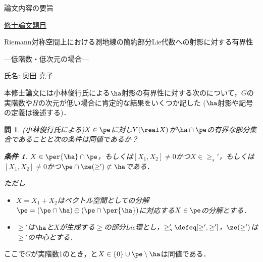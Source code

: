 \documentclass[12pt,dvipdfmx,uplatex]{jsarticle}
\newcounter{countabst}
\newtheorem{prob-a}[countabst]{問}
\newtheorem{cond-a}[countabst]{条件}
\newcommand{\nsubset}{\not\subset}
\begin{document}
% 
\begin{center}
  論文内容の要旨
\end{center}

\noindent\underline{修士論文題目}
\vspace{-1em}
\begin{center}
  Riemann対称空間上における測地線の簡約部分Lie代数への射影に対する有界性

  ---低階数・低次元の場合---
\end{center}
\vspace{-0.5em}

\noindent 氏名: 奥田 堯子

\vspace{0.5em}

本修士論文には小林俊行氏による$\ha$射影の有界性に対する次のについて，$G$の実階数や$H$の次元が低い場合に肯定的な結果をいくつか記した ($\ha$射影や記号の定義は後述する)．

\begin{prob-a}(小林俊行氏による)\label{prob:1121}
  $X\in \pe$に対し$Y(\real X)$が$ \ha\cap \pe$の有界な部分集合であることと次の条件は同値であるか？
  \begin{cond-a}\label{cond:a}
    $X\in \per{\ha}\cap\pe $，もしくは$[X_1, X_2] \neq 0 $かつ$X\in \ge_{s}' $，もしくは$[X_1, X_2] \neq 0 $かつ$\pe\cap \ze(\ge') \nsubset \ha  $である．
  \end{cond-a}

  ただし
  \begin{itemize}
    \vspace{-1em}
  \item $X = X_1 + X_2 $はベクトル空間としての分解$\pe =(\pe\cap \ha)\oplus(\pe\cap\per{\ha}) $に対応する$X\in \pe$の分解とする．
  \item $\ge ' $は$\ha$と$X$が生成する$\ge$の部分Lie環とし，$\ge'_{s} \defeq [\ge',\ge'] $，$\ze(\ge') $は$\ge'$の中心とする．
  \end{itemize}
\end{prob-a}
\vspace{-0.5em}
ここで$G$が実階数1のとき，と$X\in \{0\}\cup\pe\setminus\ha $は同値である．
\end{document}
